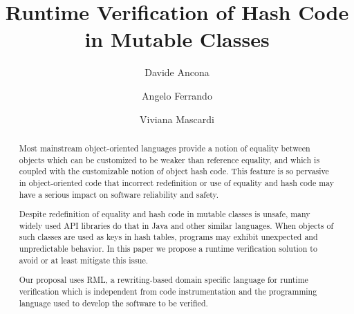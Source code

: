 \documentclass[sigconf,screen]{acmart}
\newcommand{\rml}{RML\xspace}
\begin{document}
\title{Runtime Verification of Hash Code in Mutable Classes}

\author{Davide Ancona}
\author{Angelo Ferrando}
\author{Viviana Mascardi}



\begin{abstract}
Most mainstream object-oriented languages provide a notion of equality between objects which can be customized to be weaker than
reference equality, and which is coupled with the customizable notion of object hash code.
This feature is so pervasive in object-oriented code that incorrect redefinition or use of equality and hash code
may have a serious impact on software reliability and safety.

Despite redefinition of equality and hash code in mutable classes is unsafe,
many widely used API libraries do that in Java and other similar languages.
When objects of such classes are used as keys in hash tables, programs may exhibit unexpected and unpredictable behavior.
In this paper we propose a runtime verification solution to avoid or at least mitigate this issue.

Our proposal uses \rml, a rewriting-based domain specific language for runtime verification
which is independent from code instrumentation and  the programming language used
to develop the software to be verified. 
\end{abstract}
\end{document}
